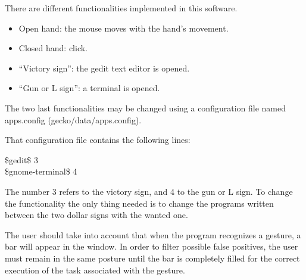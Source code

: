 There are different functionalities implemented in this software. 
\begin{itemize}
\item Open hand: the mouse moves with the hand's movement.
\item Closed hand: click.
\item ``Victory sign'': the gedit text editor is opened.
\item ``Gun or L sign'': a terminal is opened. 
\end{itemize}

The two last functionalities may be changed using a configuration file named apps.config (gecko/data/apps.config). 

That configuration file contains the following lines:
\\[0.5cm]
\begin{center}
\$gedit\$ 3 \\
\$gnome-terminal\$ 4
\\[0.5cm]
\end{center}

The number 3 refers to the victory sign, and  4 to the gun or L sign. To change the functionality the only thing needed is to change the programs written between the two dollar signs with the wanted one. 

The user should take into account that when the program recognizes a gesture, a bar will appear in the window. In order to filter possible false positives, the user must remain in the same posture until the bar is completely filled for the correct execution of the task associated with the gesture. 


\newpage
